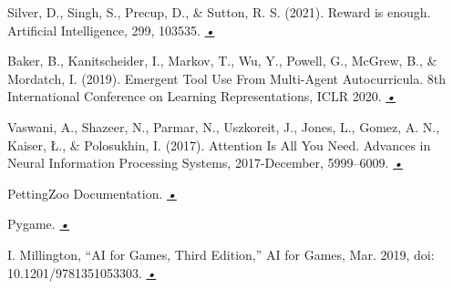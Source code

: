 \begin{thebibliography}{99}

 Silver, D., Singh, S., Precup, D., \& Sutton, R. S. (2021). Reward is enough. Artificial Intelligence, 299, 103535.  \href{ https://doi.org/10.1016/J.ARTINT.2021.103535}{\emph{•}}

 Baker, B., Kanitscheider, I., Markov, T., Wu, Y., Powell, G., McGrew, B., \& Mordatch, I. (2019). Emergent Tool Use From Multi-Agent Autocurricula. 8th International Conference on Learning Representations, ICLR 2020. \href{https://arxiv.org/abs/1909.07528v2}{\emph{•}}

 Vaswani, A., Shazeer, N., Parmar, N., Uszkoreit, J., Jones, L., Gomez, A. N., Kaiser, Ł., \& Polosukhin, I. (2017). Attention Is All You Need. Advances in Neural Information Processing Systems, 2017-December, 5999–6009. \href{https://arxiv.org/abs/1706.03762v7}{\emph{•}}

 PettingZoo Documentation. \href{https://pettingzoo.farama.org/}{\emph{•}}

 Pygame. \href{https://www.pygame.org/news/}{\emph{•}}

 I. Millington, “AI for Games, Third Edition,” AI for Games, Mar. 2019, doi: 10.1201/9781351053303. \href{https://www.taylorfrancis.com/books/mono/10.1201/9781351053303/ai-games-third-edition-ian-millington}{\emph{•}}

\end{thebibliography}
